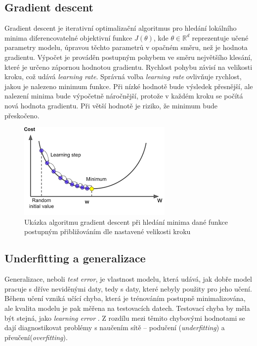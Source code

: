 \subsection*{Gradient descent}
Gradient descent je iterativní optimalizační algoritmus pro hledání lokálního minima diferencovatelné objektivní funkce $J(\theta)$, kde $\theta \in \mathbb{R}^d$ reprezentuje učené parametry modelu, úpravou těchto parametrů v opačném směru, než je hodnota gradientu. Výpočet je prováděn postupným pohybem ve směru největšího klesání, které je určeno zápornou hodnotou gradientu. Rychlost pohybu závisí na velikosti kroku, což udává \textit{learning rate}. Správná volba \textit{learning rate} ovlivňuje rychlost, jakou je nalezeno minimum funkce. Při nízké hodnotě bude výsledek přesnější, ale nalezení minima bude výpočetně náročnější, protože v každém kroku se počítá nová hodnota gradientu. Při větší hodnotě je riziko, že minimum bude přeskočeno\cite{ruder2016overview}.
\begin{figure}[H]
    \centering
    \includegraphics[scale=0.7]{obrazky-figures/gradientdescent.png}
    \caption{\label{fig:gradientdescent}Ukázka algoritmu gradient descent při hledání minima dané funkce postupným přibližováním dle nastavené velikosti kroku}
\end{figure}


\subsection{Underfitting a generalizace}
Generalizace, neboli \textit{test error}, je vlastnost modelu, která udává, jak dobře model pracuje s dříve neviděnými daty, tedy s daty, které nebyly použity pro jeho učení. Během učení vzniká učící chyba, která je trénováním postupně minimalizována, ale kvalita modelu je pak měřena na testovacích datech. 
Testovací chyba by měla být stejná, jako \textit{learning error} . Z rozdílu mezi těmito chybovými hodnotami se dají diagnostikovat problémy s naučením sítě -- podučení (\textit{underfitting}) a přeučení(\textit{overfitting}). 

